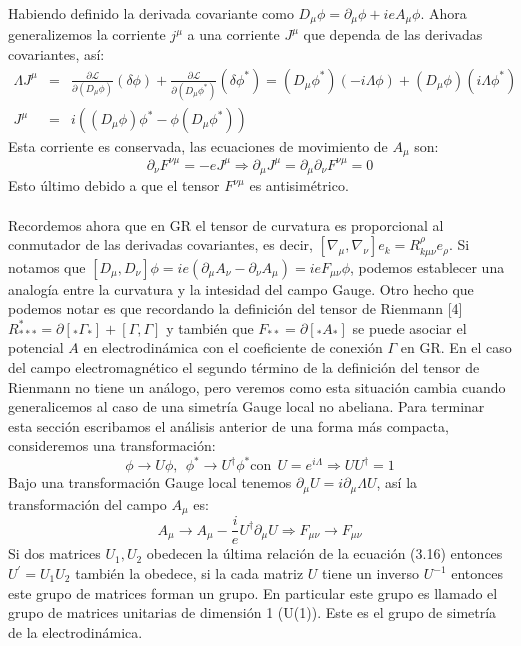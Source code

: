 Habiendo definido la derivada covariante como $D_{\mu}\phi=\partial_{\mu}\phi+ieA_{\mu}\phi$. Ahora generalizemos la corriente $j^\mu$ a una corriente $J^\mu$ que dependa de las derivadas covariantes, así:\begin{eqnarray}
\nonumber \Lambda J^{\mu}&=&\frac{\partial\mathcal{L}}{\partial(D_{\mu}\phi)}(\delta\phi)+\frac{\partial\mathcal{L}}{\partial(D_{\mu}\phi^{*})}(\delta\phi^{*})=(D_{\mu}\phi^{*})(-i\Lambda\phi)+(D_{\mu}\phi)(i\Lambda\phi^{*})\\
J^\mu &=& i((D_{\mu}\phi)\phi^{*}-\phi(D_{\mu}\phi^{*}))
\end{eqnarray}
Esta corriente es conservada, las ecuaciones de movimiento de $A_\mu$ son:
\begin{equation}
\partial_{\nu}F^{\nu\mu}=-eJ^{\mu}\Rightarrow\partial_{\mu}J^{\mu}=\partial_{\mu}\partial_{\nu}F^{\nu\mu}=0
\end{equation} 
Esto último debido a que el tensor $F^{\nu\mu}$ es antisimétrico.
\\
\\
Recordemos ahora que en GR el tensor de curvatura es proporcional al conmutador de las derivadas covariantes, es decir, $[\nabla_{\mu},\nabla_{\nu}]e_{k}=R_{k\mu\nu}^{\rho}e_{\rho}$. Si notamos que $[D_{\mu},D_{\nu}]\phi=ie(\partial_{\mu}A_{\nu}-\partial_{\nu}A_{\mu})=ieF_{\mu\nu}\phi$, podemos establecer una analogía entre la curvatura y la intesidad del campo Gauge. Otro hecho que podemos notar es que recordando la definición del tensor de Rienmann [4] $R_{***}^{*}=\partial[_{*}\Gamma_{*}]+[\Gamma,\Gamma] $ y también que $F_{**}=\partial[_{*}A_{*}]$ se puede asociar el potencial $A$ en electrodinámica con el coeficiente de conexión $\Gamma$ en GR. En el caso  del campo electromagnético el segundo término de la definición del tensor de Rienmann no tiene un análogo, pero veremos como esta situación cambia cuando generalicemos al caso de una simetría Gauge local no abeliana. Para terminar esta sección escribamos el análisis anterior de una forma más compacta, consideremos una transformación:
\begin{equation}
\phi\to U\phi,\ \ \phi^{*}\to U^{\dagger}\phi^{*}\text{con}\ \ U=e^{i\Lambda}\Rightarrow UU^{\dagger}=1
\end{equation}
Bajo una transformación Gauge local tenemos $\partial_\mu U=i\partial_\mu\Lambda U$, así la transformación del campo $A_\mu$ es:
\begin{equation}
A_{\mu}\to A_{\mu}-\frac{i}{e}U^{\dagger}\partial_{\mu}U\Rightarrow F_{\mu\nu}\to F_{\mu\nu}
\end{equation}
Si dos matrices $U_1,U_2$ obedecen la última relación de la ecuación (3.16) entonces $U^{\prime}=U_1U_2$ también la obedece, si la cada matriz $U$ tiene un inverso $U^{-1}$ entonces este grupo de matrices forman un grupo. En particular este grupo es llamado el grupo de matrices unitarias de dimensión 1 (U(1)). Este es el grupo de simetría de la electrodinámica.




